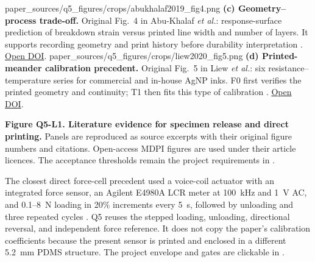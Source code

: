 \vspace{0.75em}
\noindent
\qfivelitpanel{0.185\textheight}
  {paper_sources/q5_figures/crops/abukhalaf2019_fig4.png}
  {\textbf{(c) Geometry--process trade-off.} Original Fig.~4 in Abu-Khalaf
  \textit{et al.}: response-surface prediction of breakdown strain versus
  printed line width and number of layers. It supports recording geometry and
  print history before durability interpretation \cite{q4abukhalaf2019}.
  \href{https://doi.org/10.3390/ma12203329}{Open DOI}.}
\hfill
\qfivelitpanel{0.185\textheight}
  {paper_sources/q5_figures/crops/liew2020_fig5.png}
  {\textbf{(d) Printed-meander calibration precedent.} Original Fig.~5 in
  Liew \textit{et al.}: six resistance--temperature series for commercial and
  in-house AgNP inks. F0 first verifies the printed geometry and continuity;
  T1 then fits this type of calibration \cite{liew2020}.
  \href{https://doi.org/10.3390/ecsa-7-08216}{Open DOI}.}

\vfill
{\fontsize{6.7}{7.7}\selectfont\color{AUBGray}
\textbf{Figure Q5-L1. Literature evidence for specimen release and direct
printing.} Panels are reproduced as source excerpts with their original
figure numbers and citations. Open-access MDPI figures are used under their
article licences. The acceptance thresholds remain the project requirements
in .\par}

\clearpage
\hypertarget{q5-mechanical}{}


{\fontsize{8.9}{10.45}\selectfont
The closest direct force-cell precedent used a voice-coil actuator with an
integrated force sensor, an Agilent E4980A LCR meter at 100~kHz and 1~V AC, and
0.1--8~N loading in 20\% increments every 5~s, followed by unloading and three
repeated cycles \cite{albrecht2018conf,albrecht2019}. Q5 reuses the stepped
loading, unloading, directional reversal, and independent force reference. It
does not copy the paper's calibration coefficients because the present sensor
is printed and enclosed in a different 5.2~mm PDMS structure. The project
envelope and gates are clickable in
.\par}

